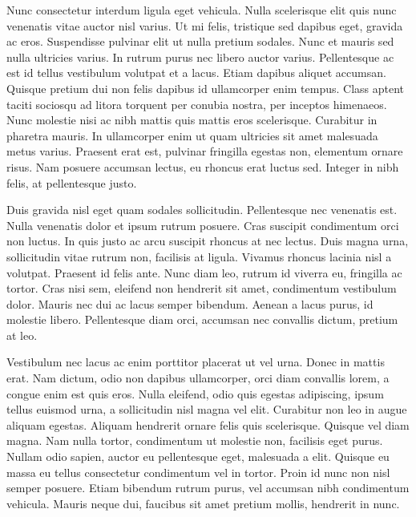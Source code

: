 Nunc consectetur interdum ligula eget vehicula.
Nulla scelerisque elit quis nunc venenatis vitae auctor nisl varius.
Ut mi felis, tristique sed dapibus eget, gravida ac eros.
Suspendisse pulvinar elit ut nulla pretium sodales.
Nunc et mauris sed nulla ultricies varius.
In rutrum purus nec libero auctor varius.
Pellentesque ac est id tellus vestibulum volutpat et a lacus.
Etiam dapibus aliquet accumsan.
Quisque pretium dui non felis dapibus id ullamcorper enim tempus.
Class aptent taciti sociosqu ad litora torquent per conubia nostra, per inceptos himenaeos.
Nunc molestie nisi ac nibh mattis quis mattis eros scelerisque.
Curabitur in pharetra mauris.
In ullamcorper enim ut quam ultricies sit amet malesuada metus varius.
Praesent erat est, pulvinar fringilla egestas non, elementum ornare risus.
Nam posuere accumsan lectus, eu rhoncus erat luctus sed.
Integer in nibh felis, at pellentesque justo.

Duis gravida nisl eget quam sodales sollicitudin.
Pellentesque nec venenatis est.
Nulla venenatis dolor et ipsum rutrum posuere.
Cras suscipit condimentum orci non luctus.
In quis justo ac arcu suscipit rhoncus at nec lectus.
Duis magna urna, sollicitudin vitae rutrum non, facilisis at ligula.
Vivamus rhoncus lacinia nisl a volutpat.
Praesent id felis ante.
Nunc diam leo, rutrum id viverra eu, fringilla ac tortor.
Cras nisi sem, eleifend non hendrerit sit amet, condimentum vestibulum dolor.
Mauris nec dui ac lacus semper bibendum.
Aenean a lacus purus, id molestie libero.
Pellentesque diam orci, accumsan nec convallis dictum, pretium at leo.

Vestibulum nec lacus ac enim porttitor placerat ut vel urna.
Donec in mattis erat.
Nam dictum, odio non dapibus ullamcorper, orci diam convallis lorem, a congue enim est quis eros.
Nulla eleifend, odio quis egestas adipiscing, ipsum tellus euismod urna, a sollicitudin nisl magna vel elit.
Curabitur non leo in augue aliquam egestas.
Aliquam hendrerit ornare felis quis scelerisque.
Quisque vel diam magna.
Nam nulla tortor, condimentum ut molestie non, facilisis eget purus.
Nullam odio sapien, auctor eu pellentesque eget, malesuada a elit.
Quisque eu massa eu tellus consectetur condimentum vel in tortor.
Proin id nunc non nisl semper posuere.
Etiam bibendum rutrum purus, vel accumsan nibh condimentum vehicula.
Mauris neque dui, faucibus sit amet pretium mollis, hendrerit in nunc.

